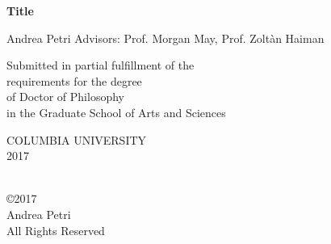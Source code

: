 \documentclass[12pt]{report}           %
\begin{document}

%







\thispagestyle{empty}


\def\thesistitle{Title}


\pagestyle{empty}

\begin{center}

{\Large \bf \thesistitle}

\vskip1.5in

{\Large  Andrea Petri } %
\vskip0.5in
{\Large  Advisors: Prof. Morgan May, Prof. Zolt\`an Haiman } 



\vskip1.1in


\large
Submitted in partial fulfillment of the               \\
requirements for the degree                           \\
of Doctor of Philosophy                               \\
in the Graduate School of Arts and Sciences           \\

\vskip0.5in

COLUMBIA UNIVERSITY                                   \\
2017                                                  \\

\end{center}


\clearpage


\begin{center}
\ \\
\vskip5.5in
\copyright 2017 \\[3mm]
Andrea Petri\\
All Rights Reserved
\end{center}
\clearpage


\end{document}
